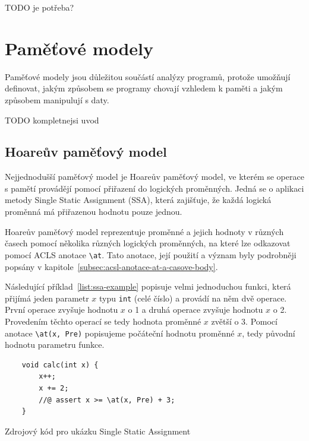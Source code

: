 TODO je potřeba?

\section{Paměťové modely}
\label{sec:frama-c-pametove-modely}


Paměťové modely jsou důležitou součástí analýzy programů,
protože umožňují definovat, jakým způsobem se programy chovají
vzhledem k paměti a jakým způsobem manipulují s daty.

TODO kompletnejsi uvod

\subsection{Hoareův paměťový model}
\label{subsec:hoareuv-pametovy-model}

Nejjednodušší paměťový model je Hoareův paměťový model,
ve kterém se operace s pamětí provádějí pomocí přiřazení do logických proměnných.
Jedná se o aplikaci metody Single Static Assignment (SSA),
která zajišťuje, že každá logická proměnná má přiřazenou hodnotu pouze jednou.

Hoareův paměťový model reprezentuje proměnné a jejich hodnoty v různých časech
pomocí několika různých logických proměnných, na které lze odkazovat pomocí
ACLS anotace \texttt{\textbackslash at}.
Tato anotace, její použití a význam byly podrobněji popsány v kapitole~\ref{subsec:acsl-anotace-at-a-casove-body}.

Následující příklad~\ref{list:ssa-example} popisuje velmi jednoduchou funkci,
která přijímá jeden parametr $x$ typu \texttt{int} (celé číslo) a provádí na něm dvě operace.
První operace zvyšuje hodnotu $x$ o 1 a druhá operace zvyšuje hodnotu $x$ o 2.
Provedením těchto operací se tedy hodnota proměnné $x$ zvětší o 3.
Pomocí anotace \texttt{\textbackslash at(x, Pre)} popisujeme počáteční hodnotu proměnné $x$,
tedy původní hodnotu parametru funkce.

\begin{listing}[H]
    \begin{verbatim}
    void calc(int x) {
        x++;
        x += 2;
        //@ assert x >= \at(x, Pre) + 3;
    }
    \end{verbatim}
    \caption{Zdrojový kód pro ukázku Single Static Assignment}
    \label{list:ssa-example}
\end{listing}

